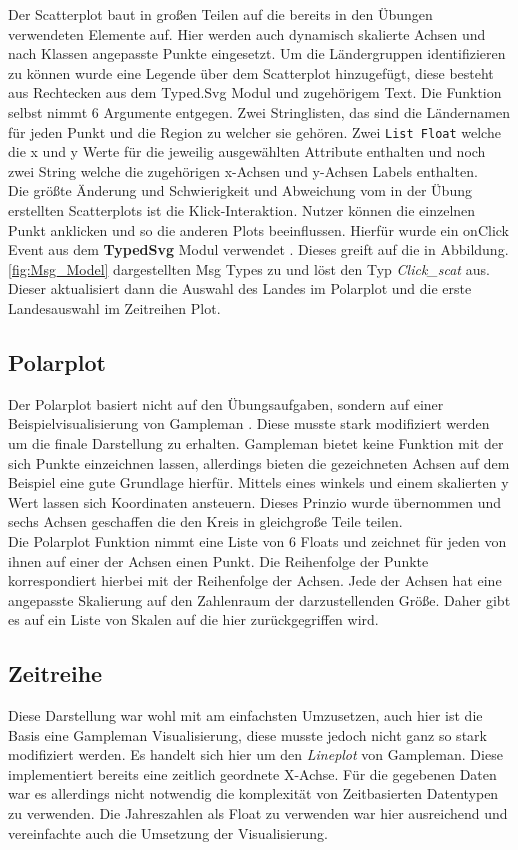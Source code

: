 Der Scatterplot baut in großen Teilen auf die bereits in den Übungen verwendeten Elemente auf. Hier werden auch dynamisch skalierte Achsen und nach Klassen angepasste Punkte eingesetzt. Um die Ländergruppen identifizieren zu können wurde eine Legende über dem Scatterplot hinzugefügt, diese besteht aus Rechtecken aus dem Typed.Svg Modul und zugehörigem Text. Die Funktion selbst nimmt 6 Argumente entgegen. Zwei Stringlisten, das sind die Ländernamen für jeden Punkt und die Region zu welcher sie gehören. Zwei \texttt{List Float} welche die x und y Werte für die jeweilig ausgewählten Attribute enthalten und noch zwei String welche die zugehörigen x-Achsen und y-Achsen Labels enthalten. \\

Die größte Änderung und Schwierigkeit und Abweichung vom in der Übung erstellten Scatterplots ist die Klick-Interaktion. Nutzer können die einzelnen Punkt anklicken und so die anderen Plots beeinflussen. Hierfür wurde ein onClick Event aus dem \textbf{TypedSvg} Modul verwendet \cite{typedsvg}. Dieses greift auf die in Abbildung.\ref{fig:Msg_Model} dargestellten Msg Types zu und löst den Typ \textit{Click\_scat} aus. 
Dieser aktualisiert dann die Auswahl des Landes im Polarplot und die erste Landesauswahl im Zeitreihen Plot. 

\subsection{Polarplot}

Der Polarplot basiert nicht auf den Übungsaufgaben, sondern auf einer Beispielvisualisierung von Gampleman \cite{polarplot}. Diese musste stark modifiziert werden um die finale Darstellung zu erhalten. Gampleman bietet keine Funktion mit der sich Punkte einzeichnen lassen, allerdings bieten die gezeichneten Achsen auf dem Beispiel eine gute Grundlage hierfür. Mittels eines winkels und einem skalierten y Wert lassen sich Koordinaten ansteuern. Dieses Prinzio wurde übernommen und sechs Achsen geschaffen die den Kreis in gleichgroße Teile teilen. \\

Die Polarplot Funktion nimmt eine Liste von 6 Floats und zeichnet für jeden von ihnen auf einer der Achsen einen Punkt. Die Reihenfolge der Punkte korrespondiert hierbei mit der Reihenfolge der Achsen. Jede der Achsen hat eine angepasste Skalierung auf den Zahlenraum der darzustellenden Größe. Daher gibt es auf ein Liste von Skalen auf die hier zurückgegriffen wird. 

\subsection{Zeitreihe}

Diese Darstellung war wohl mit am einfachsten Umzusetzen, auch hier ist die Basis eine Gampleman Visualisierung, diese musste jedoch nicht ganz so stark modifiziert werden. Es handelt sich hier um den \textit{Lineplot} von Gampleman.\cite{linechart} Diese implementiert bereits eine zeitlich geordnete X-Achse. Für die gegebenen Daten war es allerdings nicht notwendig die komplexität von Zeitbasierten Datentypen zu verwenden. Die Jahreszahlen als Float zu verwenden war hier ausreichend und vereinfachte auch die Umsetzung der Visualisierung. 